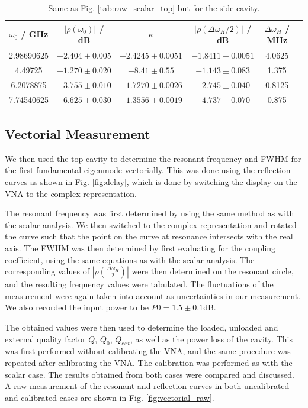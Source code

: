 \documentclass[a4paper]{report}
\numberwithin{equation}{section}
\begin{document}
\begin{table}[htb!]
	\centering
	\begin{tabular}{|c|c|c|c|c|c|}
		\hline $\omega_0$ / GHz & $\left| \rho(\omega_0) \right|$ / dB & $\kappa$ & $\left| \rho(\Delta\omega_H / 2) \right|$ / dB & $\Delta\omega_H$ / MHz\\ 
		\hline 2.98690625 & $-2.404 \pm 0.005$ & $-2.4245 \pm 0.0051$ & $-1.8411 \pm 0.0051$ & 4.0625 \\ 
		\hline 4.49725 & $-1.270 \pm 0.020$ & $-8.41 \pm 0.55$ & $-1.143 \pm 0.083$ & 1.375 \\
		\hline 6.2078875 & $-3.755 \pm 0.010$ & $ -1.7270 \pm 0.0026$ & $-2.745 \pm 0.040$ & 0.8125 \\
		\hline 7.74540625 & $-6.625 \pm 0.030$ & $-1.3556 \pm 0.0019$ & $-4.737 \pm 0.070$ & 0.875 \\ 
		\hline
	\end{tabular}
	\caption{Same as Fig. \ref{tab:raw_scalar_top} but for the side cavity. }
	\label{tab:raw_scalar_side}
\end{table}


\subsection{Vectorial Measurement}

We then used the top cavity to determine the resonant frequency and FWHM for the
first fundamental eigenmode vectorially. This was done using the reflection
curves as shown in Fig. \ref{fig:delay}, which is done by switching the display on the VNA to the complex representation. \par 

The resonant frequency was first determined by using the same method as with the
scalar analysis. We then switched to the complex representation and rotated the
curve such that the point on the curve at resonance intersects with the real
axis. The FWHM was then determined by first evaluating for the coupling
coefficient, using the same equations as with the scalar analysis. The
corresponding values of $|\rho(\frac{\Delta\omega_H}{2})|$ were then determined
on the resonant circle, and the resulting frequency values were tabulated.
The fluctuations of the measurement were again taken into account as uncertainties
in our measurement. We also recorded the input power to be $P0 = 1.5 \pm 0.1$dB. \par 

The obtained values were then used to determine the loaded, unloaded and external quality
factor $Q$, $Q_0$, $Q_{ext}$, as well as the power loss of the cavity. This was first
performed without calibrating the VNA, and the same procedure was repeated after
calibrating the VNA. The calibration was performed as with the scalar case. 
The results obtained from both cases were compared and discussed. A raw measurement of the resonant and reflection curves in
both uncalibrated and calibrated cases are shown in Fig. \ref{fig:vectorial_raw}.   
\end{document}
